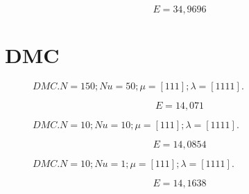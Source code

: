 \begin{equation}
    E = 34,9696
\end{equation}


%     



\section{DMC}

\begin{figure}[H]
    \centering
    
    \caption{$DMC. N = 150; Nu = 50; \mu = [1 1 1]; \lambda = [1 1 1 1].$}
\end{figure}

\begin{equation}
    E = 14,071
\end{equation}


\begin{figure}[H]
    \centering
    
    \caption{$DMC. N = 10; Nu = 10; \mu = [1 1 1]; \lambda = [1 1 1 1].$}
\end{figure}

\begin{equation}
    E = 14,0854
\end{equation}


\begin{figure}[H]
    \centering
    
    \caption{$DMC. N = 10; Nu = 1; \mu = [1 1 1]; \lambda = [1 1 1 1].$}
\end{figure}

\begin{equation}
    E = 14,1638
\end{equation}


